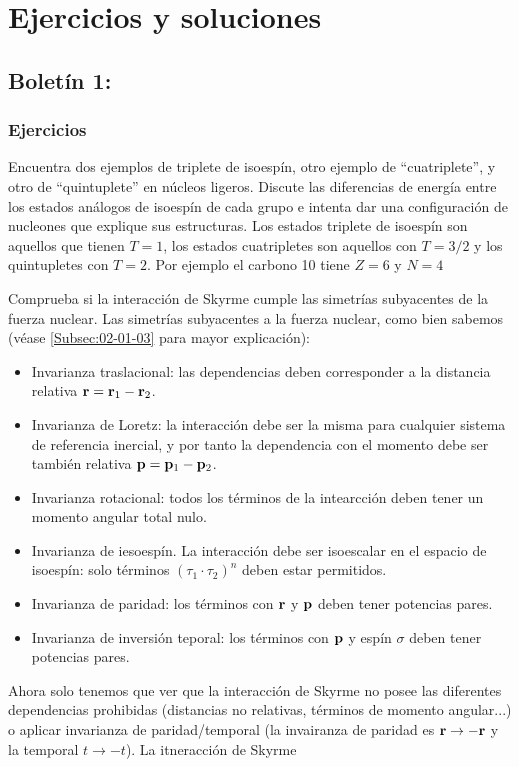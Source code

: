 
\chapter{Ejercicios y soluciones}

\section{Boletín 1:} \label{Sec:Ej-01}

\subsection{Ejercicios}
\tcbstartrecording

\begin{texercise}
    Encuentra dos ejemplos de triplete de isoespín, otro ejemplo de ``cuatriplete'', y otro de ``quintuplete'' en núcleos ligeros. Discute las diferencias de energía entre los estados análogos de isoespín de cada grupo e intenta dar una configuración de nucleones que explique sus estructuras.
\tcblower
    Los estados triplete de isoespín son aquellos que tienen $T=1$, los estados cuatripletes son aquellos con $T=3/2$ y los quintupletes con $T=2$. Por ejemplo el carbono 10 tiene $Z=6$ y $N=4$ 
\end{texercise}

\begin{texercise}
    Comprueba si la interacción de Skyrme cumple las simetrías subyacentes de la fuerza nuclear.
\tcblower
    Las simetrías subyacentes a la fuerza nuclear, como bien sabemos (véase \cref{Subsec:02-01-03} para mayor explicación): 

    \begin{itemize}
        \item Invarianza traslacional: las dependencias deben corresponder a la distancia relativa $\mathbf{r}=\mathbf{r}_1-\mathbf{r}_2$.
        \item Invarianza de Loretz: la interacción debe ser la misma para cualquier sistema de referencia inercial, y por tanto la dependencia con el momento debe ser también relativa $\mathbf{p}=\mathbf{p}_1-\mathbf{p}_2$.
        \item Invarianza rotacional: todos los términos de la intearcción deben tener un momento angular total nulo.
        \item Invarianza de iesoespín. La interacción debe ser isoescalar en el espacio de isoespín: solo términos $(\tau_1\cdot\tau_2)^n$ deben estar permitidos. 
        \item Invarianza de paridad: los términos con $\mathbf{r}$ y $\mathbf{p}$ deben tener potencias pares. 
        \item Invarianza de inversión teporal: los términos con $\mathbf{p}$ y espín $\sigma$ deben tener potencias pares. 
    \end{itemize}
    Ahora solo tenemos que ver que la interacción de Skyrme no posee las diferentes dependencias prohibidas (distancias no relativas, términos de momento angular...) o aplicar invarianza de paridad/temporal (la invairanza de paridad es $\mathbf{r}\rightarrow -\mathbf{r}$ y la temporal $t\rightarrow -t$). La itneracción de Skyrme
\end{texercise}


